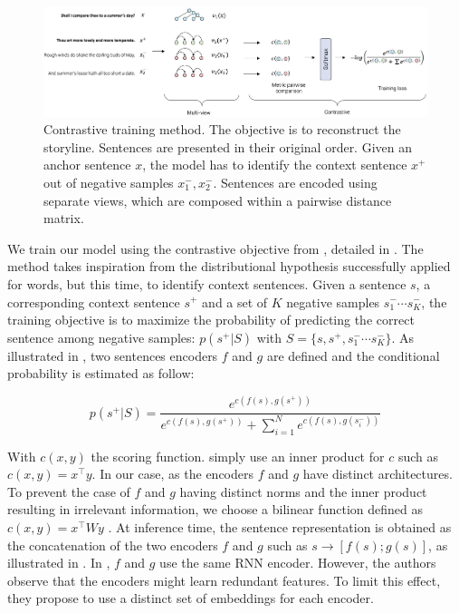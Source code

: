 \begin{figure}[!htb]
\begin{center}
\includegraphics[width=15cm]{images/contrastive-4.png}
\end{center}
\caption{Contrastive training method. The objective is to reconstruct the storyline. Sentences are presented in their original order. Given an anchor sentence $x$, the model has to identify the context sentence $x^+$ out of negative samples $x_1^-, x_2^-$. Sentences are encoded using separate views, which are composed within a pairwise distance matrix. }
\end{figure}

We train our model using the contrastive objective from \textcite{logeswaran_18}, detailed in . The method takes inspiration from the distributional hypothesis successfully applied for words, but this time, to identify context sentences. Given a sentence $s$, a corresponding context sentence $s^+$ and a set of $K$ negative samples $s^-_1 \cdots s^-_K$, the training objective is to maximize the probability of predicting the correct sentence among negative samples: $p(s^+ | S)$ with $S = \{s, s^+, s^-_1 \cdots s^-_K\}$. As illustrated in , two sentences encoders $f$ and $g$ are defined and the conditional probability is estimated as follow:

\[
p(s^+ | S) = \frac{e^{c\left(f(s), g(s^+)\right)}}{e^{c\left(f(s), g(s^+)\right)}+\sum_{i=1}^Ne^{c\left(f(s), g(s^-_i)\right)}}
\]

With $c(x, y)$ the scoring function. \textcite{logeswaran_18} simply use an inner product for $c$ such as $c\left(x, y\right) = x^{\top}y$. In our case, as the encoders $f$ and $g$ have distinct architectures. To prevent the case of $f$ and $g$ having distinct norms and the inner product resulting in irrelevant information, we choose a bilinear function defined as $c\left(x, y\right) = x^{\top}Wy$ \parencite{tschannen_20}. At inference time, the sentence representation is obtained as the concatenation of the two encoders $f$ and $g$ such as $s \rightarrow [f(s);g(s)]$, as illustrated in . In \textcite{logeswaran_18}, $f$ and $g$ use the same RNN encoder. However, the authors observe that the encoders might learn redundant features. To limit this effect, they propose to use a distinct set of embeddings for each encoder. 

